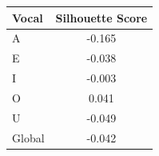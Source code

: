 \begin{tabular}{lc}
\toprule
\rowcolor{col01}
Vocal & Silhouette Score \\
\midrule
A & -0.165 \\
E & -0.038 \\
I & -0.003 \\
O & 0.041 \\
U & -0.049 \\
Global & -0.042 \\
\bottomrule
\end{tabular}
